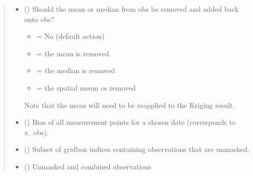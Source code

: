 \documentclass[letterpaper,10pt,english]{sphinxmanual}
\begin{document}
\begin{fulllineitems}
\begin{quote}
\begin{description}
\begin{itemize}
\item {}
\sphinxAtStartPar
{} () \textendash{}
\sphinxAtStartPar
Should the mean or median from obs be removed and added back onto obs?
\begin{itemize}
\item {}
 = No (default action)

\item {}
 = the mean is removed

\item {}
 = the median is removed

\item {}
 = the spatial meam os removed

\end{itemize}

\sphinxAtStartPar
Note that the mean will need to be reapplied to the Kriging result.


\item {}
\sphinxAtStartPar
{} (\sphinxstyleliteralemphasis{\sphinxupquote{{[}}}\sphinxstyleliteralemphasis{\sphinxupquote{{]} }}\sphinxstyleliteralemphasis{\sphinxupquote{| }}) \textendash{} Bias of all measurement points for a chosen date (corresponds to x\_obs).

\end{itemize}

\sphinxAtStartPar
{}

\sphinxAtStartPar
\begin{itemize}
\item {}
\sphinxAtStartPar
{} () \textendash{} Subset of grid\sphinxhyphen{}box indices containing observations that are unmasked.

\item {}
\sphinxAtStartPar
{} () \textendash{} Unmasked and combined observations

\end{itemize}


\end{description}\end{quote}

\end{fulllineitems}
\end{document}
